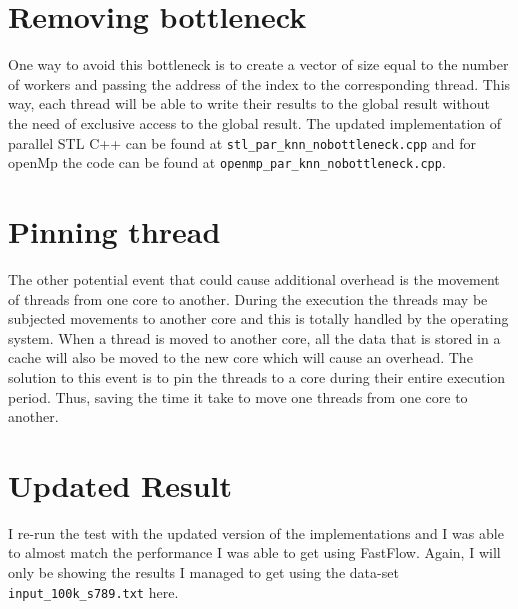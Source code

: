 \documentclass[12pt,a4paper]{report}
\begin{document}
\section{Removing bottleneck}
One way to avoid this bottleneck is to create a vector of size equal to the number of workers and passing the address of the index to the corresponding thread. This way, each thread will be able to write their results to the global result without the need of exclusive access to the global result. The updated implementation of parallel STL C++ can be found at \verb!stl_par_knn_nobottleneck.cpp! and for openMp the code can be found at \verb!openmp_par_knn_nobottleneck.cpp!.
\section{Pinning thread}
The other potential event that could cause additional overhead is the movement of threads from one core to another. During the execution the threads may be subjected movements to another core and this is totally handled by the operating system. When a thread is moved to another core, all the data that is stored in a cache will also be moved to the new core which will cause an overhead. The solution to this event is to pin the threads to a core during their entire execution period. Thus, saving the time it take to move one threads from one core to another.
\section{Updated Result}
I re-run the test with the updated version of the implementations and I was able to almost match the performance I was able to get using FastFlow. Again, I will only be showing the results I managed to get using the data-set \verb!input_100k_s789.txt! here.
\end{document}
